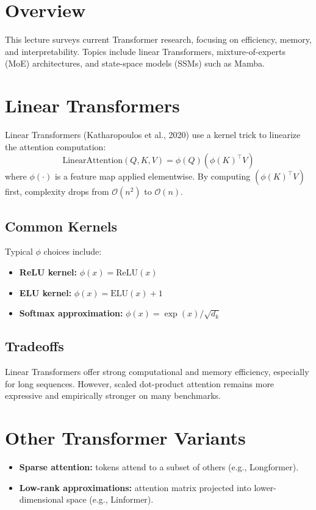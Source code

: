 \documentclass[12pt]{article}
\begin{document}
\psetheader %

\section{Overview}
This lecture surveys current Transformer research, focusing on efficiency, memory, and interpretability. Topics include linear Transformers, mixture-of-experts (MoE) architectures, and state-space models (SSMs) such as Mamba.

\section{Linear Transformers}
Linear Transformers (Katharopoulos et al., 2020) use a kernel trick to linearize the attention computation:
\[
		\text{LinearAttention}(Q,K,V) = \phi(Q)(\phi(K)^\top V)
\]
where $\phi(\cdot)$ is a feature map applied elementwise.
By computing $(\phi(K)^\top V)$ first, complexity drops from $\mathcal{O}(n^2)$ to $\mathcal{O}(n)$.

\subsection{Common Kernels}
Typical $\phi$ choices include:
\begin{itemize}
		\item \textbf{ReLU kernel:} $\phi(x)=\text{ReLU}(x)$
		\item \textbf{ELU kernel:} $\phi(x)=\text{ELU}(x)+1$
		\item \textbf{Softmax approximation:} $\phi(x)=\exp(x)/\sqrt{d_k}$
\end{itemize}

\subsection{Tradeoffs}
Linear Transformers offer strong computational and memory efficiency, especially for long sequences.
However, scaled dot-product attention remains more expressive and empirically stronger on many benchmarks.

\section{Other Transformer Variants}
\begin{itemize}
		\item \textbf{Sparse attention:} tokens attend to a subset of others (e.g., Longformer).
		\item \textbf{Low-rank approximations:} attention matrix projected into lower-dimensional space (e.g., Linformer).
\end{itemize}
\end{document}
